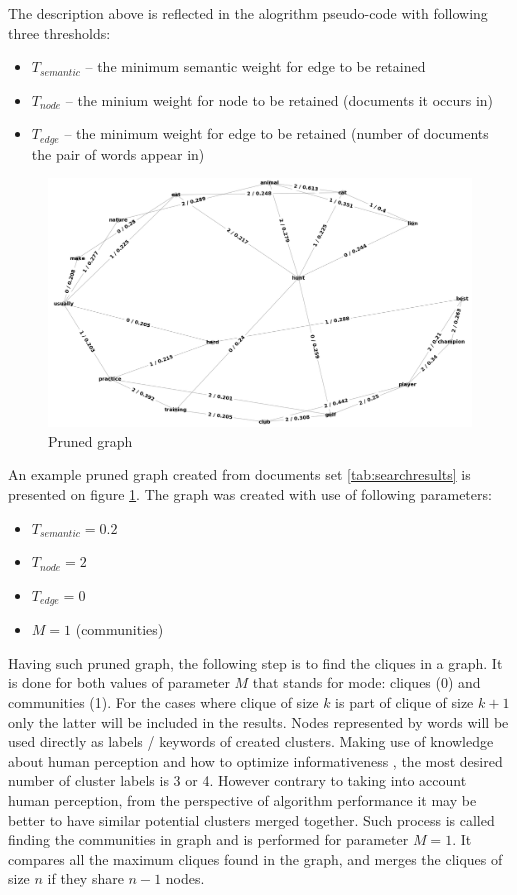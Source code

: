 \documentclass[a4paper, 12pt, oneside]{Thesis} %
\begin{document}
The description above is reflected in the alogrithm pseudo-code with following three thresholds:
\begin{itemize}
    \item $T_{semantic}$ -- the minimum semantic weight for edge to be retained
    \item $T_{node}$ -- the minium weight for node to be retained (documents it occurs in)
    \item $T_{edge}$ -- the minimum weight for edge to be retained (number of documents the pair of words appear in)
\end{itemize}

\begin{figure}[!ht]
  \centering
    \includegraphics[width=1.0\textwidth]{final_graph_cropped}
    \caption{Pruned graph}
    \label{fig:prunedgraph}
\end{figure}

An example pruned graph created from documents set \ref{tab:searchresults} is presented on figure \ref{fig:prunedgraph}. The graph was created with use of following parameters:
\begin{itemize}
    \item $T_{semantic} = 0.2$
    \item $T_{node} = 2$
    \item $T_{edge} = 0$
    \item $M = 1$ (communities)
\end{itemize}

Having such pruned graph, the following step is to find the cliques in a graph. It is done for both values of parameter $M$ that stands for mode: cliques (0) and communities (1). For the cases where clique of size $k$ is part of clique of size $k+1$ only the latter will be included in the results. Nodes represented by words will be used directly as labels / keywords of created clusters. Making use of knowledge about human perception and how to optimize informativeness \cite{lidwell2010universal}, the most desired number of cluster labels is 3 or 4. However contrary to taking into account human perception, from the perspective of algorithm performance it may be better to have similar potential clusters merged together. Such process is called finding the communities in graph and is performed for parameter $M = 1$. It compares all the maximum cliques found in the graph, and merges the cliques of size $n$ if they share $n-1$ nodes.
\end{document}
